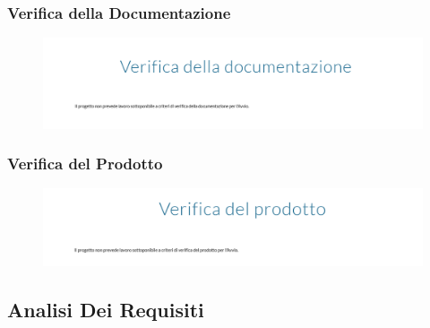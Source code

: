 \subsubsection{Verifica della Documentazione}
\begin{figure}[H]
	\includegraphics[scale=0.55]{res/images/cruscotto/avvio_5.png}
\end{figure}
\subsubsection{Verifica del Prodotto}
\begin{figure}[H]
	\includegraphics[scale=0.55]{res/images/cruscotto/avvio_6.png}
\end{figure}
\pagebreak
\subsection{Analisi Dei Requisiti}

